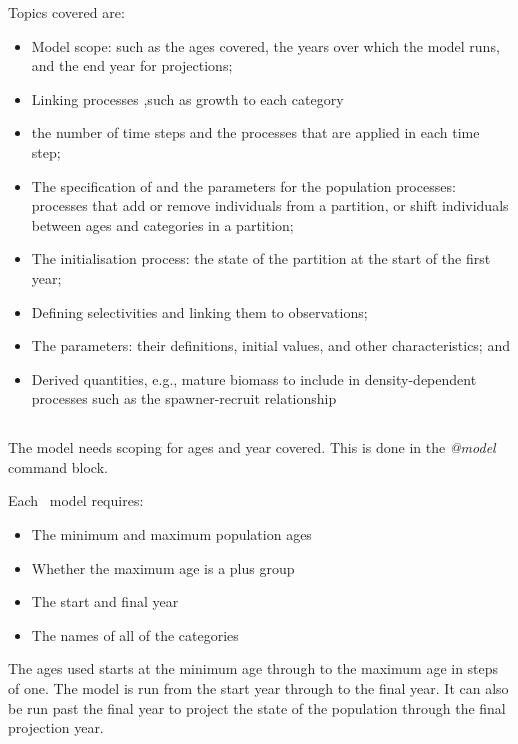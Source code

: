 Topics covered are: 

\begin{itemize}
     \item Model scope: such as the ages covered, the years over which the model runs, and the end year for projections;
     \item Linking processes ,such as growth to each category
     \item the number of time steps and the processes that are applied in each time step;
  \item The specification of and the parameters for the population processes: processes that add or remove individuals from a partition, or shift individuals between ages and categories in a partition;
   \item The initialisation process: the state of the partition at the start of the first year;
   
  \item Defining selectivities and linking them to  observations;
  \item The parameters: their definitions, initial values, and other characteristics; and
  \item Derived quantities, e.g., mature biomass to include in density-dependent processes such as the spawner-recruit relationship
\end{itemize}

\subsection{}\label{sub:sec:pop_sec}

The model needs scoping for ages and year covered. This is done in the \textit{@model} command block. 

Each \CNAME~model requires:

\begin{itemize}
\item The minimum and maximum population ages
\item Whether the maximum age is a plus group
\item The start and final year

\item The names of all of the categories
\end{itemize}

The ages used starts at the minimum age through to the maximum age in steps of one. The model is run from the start year through to the final year. It can also be run past the final year to project the state of the population through the final projection year.

